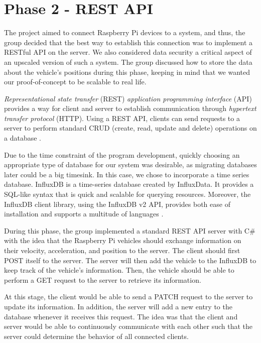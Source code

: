 \section{Phase 2 - REST API}\label{phase2}
The project aimed to connect Raspberry Pi devices to a system, and thus, the group decided that the best way to establish this connection was to implement a RESTful API on the server. We also considered data security a critical aspect of an upscaled version of such a system. The group discussed how to store the data about the vehicle's positions during this phase, keeping in mind that we wanted our proof-of-concept to be scalable to real life.

\emph{Representational state transfer} (REST) \emph{application programming interface} (API) provides a way for client and server to establish communication through \emph{hypertext transfer protocol} (HTTP). Using a REST API, clients can send requests to a server to perform standard CRUD (create, read, update and delete) operations on a database \parencite{rest_api}.

Due to the time constraint of the program development, quickly choosing an appropriate type of database for our system was desirable, as migrating databases later could be a big timesink. In this case, we chose to incorporate a time series database. InfluxDB is a time-series database created by InfluxData. It provides a SQL-like syntax that is quick and scalable for querying resources. Moreover, the InfluxDB client library, using the InfluxDB v2 API, provides both ease of installation and supports a multitude of languages \parencite{influxdb}.

During this phase, the group implemented a standard REST API server with C\# with the idea that the Raspberry Pi vehicles should exchange information on their velocity, acceleration, and position to the server. The client should first POST itself to the server. The server will then add the vehicle to the InfluxDB to keep track of the vehicle's information. Then, the vehicle should be able to perform a GET request to the server to retrieve its information.

At this stage, the client would be able to send a PATCH request to the server to update its information. In addition, the server will add a new entry to the database whenever it receives this request. The idea was that the client and server would be able to continuously communicate with each other such that the server could determine the behavior of all connected clients.

